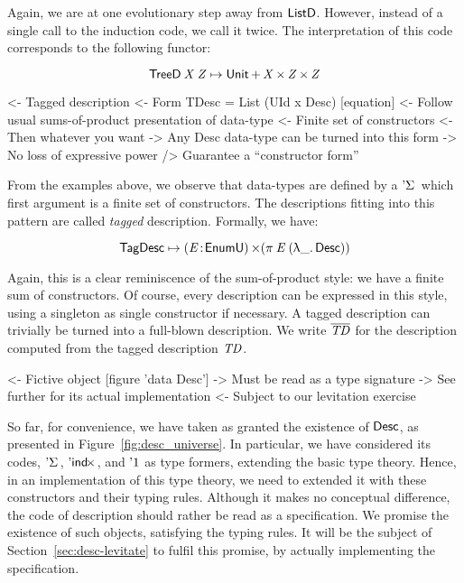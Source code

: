 Again, we are at one evolutionary step away from $\ListD$. However,
instead of a single call to the induction code, we call it twice. The
interpretation of this code corresponds to the following functor:

\[    \TreeD\: \V{X}\: \V{Z} \mapsto \Unit \mathop{\D{+}} \V{X} \Prod \V{Z} \Prod \V{Z}     \]


\begin{wstructure}
<- Tagged description
    <- Form TDesc = List (UId x Desc) [equation]
    <- Follow usual sums-of-product presentation of data-type
        <- Finite set of constructors
        <- Then whatever you want
    -> Any Desc data-type can be turned into this form
        -> No loss of expressive power
        /> Guarantee a ``constructor form''
\end{wstructure}

From the examples above, we observe that data-types are defined by a
$\DSigma{\!}{\!}$ which first argument is a finite set of
constructors. The descriptions fitting into this pattern are called
\emph{tagged} description. Formally, we have:

\[
 \TagDesc \mapsto \SIGMA{\V{E}}{\EnumU} (\spi{\V{E}}{(\LAM{\_} \Desc)})
\]

Again, this is a clear reminiscence of the sum-of-product style:
we have a finite sum of constructors. Of course, every description can
be expressed in this style, using a singleton as single constructor if
necessary. A tagged description can trivially be turned into a
full-blown description. We write $\toDesc{\V{TD}}$ for the description computed
from the tagged description $\V{TD}$.

\begin{wstructure}
<- Fictive object [figure 'data Desc']
    -> Must be read as a type signature
    -> See further for its actual implementation
        <- Subject to our levitation exercise
\end{wstructure}

So far, for convenience, we have taken as granted the existence of
$\Desc$, as presented in Figure~\ref{fig:desc_universe}. In
particular, we have considered its codes, $\DSigma{\!}{\!}$,
$\DIndx{\!}$, and $\DUnit$ as type formers, extending the basic type
theory. Hence, in an implementation of this type theory, we need to
extended it with these constructors and their typing rules. Although
it makes no conceptual difference, the code of description should
rather be read as a specification. We promise the existence of such
objects, satisfying the typing rules. It will be the subject of
Section~\ref{sec:desc-levitate} to fulfil this promise, by actually
implementing the specification.

